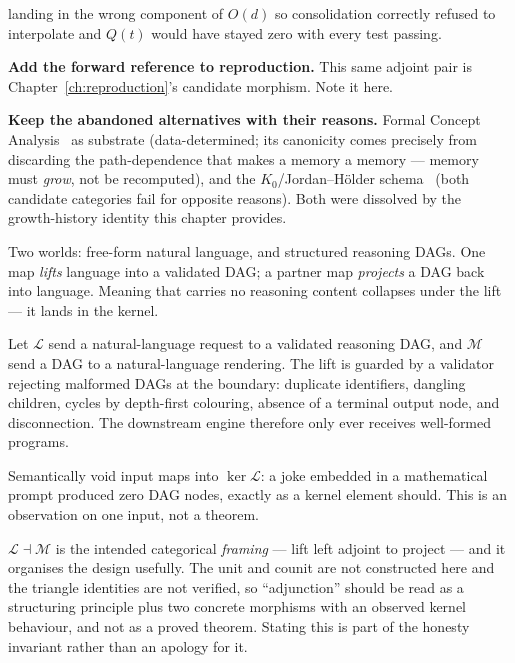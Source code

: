 \begin{workplan}{\Keep}
{    landing in the wrong component of $O(d)$ so consolidation correctly refused
    to interpolate and $Q(t)$ would have stayed zero with every test passing.
  \item \textbf{Add the forward reference to reproduction.} This same adjoint
    pair is Chapter~\ref{ch:reproduction}'s candidate morphism. Note it here.
  \item \textbf{Keep the abandoned alternatives with their reasons.} Formal
    Concept Analysis \Refuted\ as substrate (data-determined; its canonicity
    comes precisely from discarding the path-dependence that makes a memory a
    memory --- memory must \emph{grow}, not be recomputed), and the
    $K_0$/Jordan--Hölder schema \Refuted\ (both candidate categories fail for
    opposite reasons). Both were dissolved by the growth-history identity this
    chapter provides.
}

\end{workplan}

\begin{intu}\Intu
Two worlds: free-form natural language, and structured reasoning DAGs.
One map \emph{lifts} language into a validated DAG; a partner map
\emph{projects} a DAG back into language. Meaning that carries no
reasoning content collapses under the lift --- it lands in the kernel.
\end{intu}

\begin{construction}\label{con:adjunction}
Let $\mathcal L$ send a natural-language request to a validated
reasoning DAG, and $\mathcal M$ send a DAG to a natural-language
rendering. The lift is guarded by a validator rejecting malformed DAGs
at the boundary: duplicate identifiers, dangling children, cycles by
depth-first colouring, absence of a terminal output node, and
disconnection. The downstream engine therefore only ever receives
well-formed programs.
\end{construction}

\begin{remark}
Semantically void input maps into $\ker\mathcal L$: a joke embedded in a
mathematical prompt produced zero DAG nodes, exactly as a kernel element
should. This is an observation on one input, not a theorem.
\end{remark}

\begin{hon}\Hon
$\mathcal L\dashv\mathcal M$ is the intended categorical \emph{framing}
--- lift left adjoint to project --- and it organises the design
usefully. The unit and counit are not constructed here and the triangle
identities are not verified, so ``adjunction'' should be read as a
structuring principle plus two concrete morphisms with an observed
kernel behaviour, and not as a proved theorem. Stating this is part of
the honesty invariant rather than an apology for it.
\end{hon}
